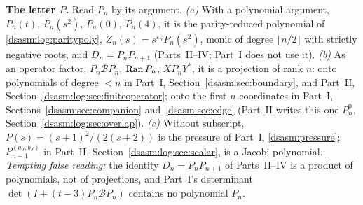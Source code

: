 \documentclass[11pt,letterpaper]{article}
\theoremstyle{remark}\newtheorem{remark}[theorem]{Remark}
\newcommand{\eps}{\varepsilon}\newcommand{\HH}{\mathcal H}\newcommand{\one}{\mathbf1}
\begin{document}
\textbf{The letter $P$.} Read $P_n$ by its argument. \emph{(a)} With a polynomial argument, $P_n(t)$, $P_n(s^2)$, $P_n(0)$, $P_n(4)$, it is the parity-reduced polynomial of \eqref{dsasm:log:paritypoly}, $Z_n(s)=s^{\eps_n}P_n(s^2)$, monic of degree $\lfloor n/2\rfloor$ with strictly negative roots, and $D_n=P_nP_{n+1}$ (Parts~II--IV; Part~I does not use it). \emph{(b)} As an operator factor, $P_n\mathcal BP_n$, $\operatorname{Ran} P_n$, $XP_nY^*$, it is a projection of rank $n$: onto polynomials of degree $<n$ in Part~I, Section~\ref{dsasm:sec:boundary}, and Part~II, Section~\ref{dsasm:log:sec:finiteoperator}; onto the first $n$ coordinates in Part~I, Sections~\ref{dsasm:sec:companion} and~\ref{dsasm:sec:edge} (Part~II writes this one $P_n^0$, Section~\ref{dsasm:log:sec:overlap}). \emph{(c)} Without subscript, $P(s)=(s+1)^2/(2(s+2))$ is the pressure of Part~I, \eqref{dsasm:pressure}; $P_{n-1}^{(a_J,b_J)}$ in Part~II, Section~\ref{dsasm:log:sec:scalar}, is a Jacobi polynomial. \emph{Tempting false reading:} the identity $D_n=P_nP_{n+1}$ of Parts~II--IV is a product of polynomials, not of projections, and Part~I's determinant $\det(I+(t-3)P_n\mathcal BP_n)$ contains no polynomial $P_n$.
\begingroup\small
\end{document}
